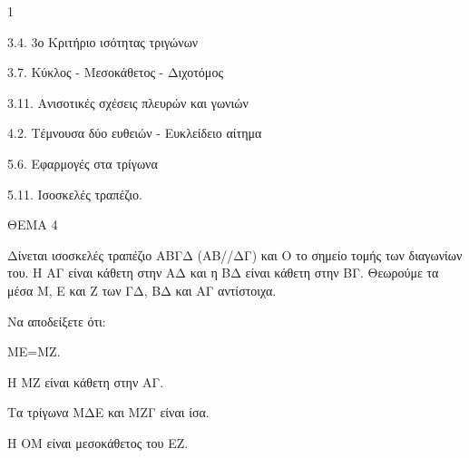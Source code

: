 \begin{ylh}{1}
    \item 3.4. 3ο Κριτήριο ισότητας τριγώνων
    \item 3.7. Κύκλος - Μεσοκάθετος - Διχοτόμος
    \item 3.11. Ανισοτικές σχέσεις πλευρών και γωνιών
    \item 4.2. Τέμνουσα δύο ευθειών - Ευκλείδειο αίτημα
    \item 5.6. Εφαρμογές στα τρίγωνα
    \item 5.11. Ισοσκελές τραπέζιο.
\end{ylh}

ΘΕΜΑ 4

Δίνεται ισοσκελές τραπέζιο ΑΒΓΔ (ΑΒ//ΔΓ) και Ο το σημείο τομής των διαγωνίων του. Η ΑΓ είναι κάθετη στην ΑΔ και η ΒΔ είναι κάθετη στην ΒΓ. Θεωρούμε τα μέσα Μ, Ε και Ζ των ΓΔ, ΒΔ και ΑΓ αντίστοιχα.

Να αποδείξετε ότι:

\begin{alist}
\item ΜΕ=ΜΖ. 

\item Η ΜΖ είναι κάθετη στην ΑΓ. 

\item Τα τρίγωνα ΜΔΕ και ΜΖΓ είναι ίσα. 

\item Η ΟΜ είναι μεσοκάθετος του ΕΖ. 


\end{alist}
